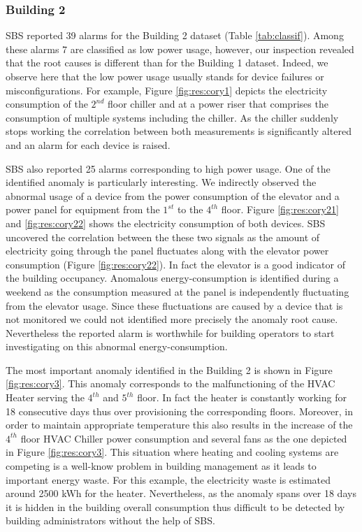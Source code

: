 \subsubsection{Building 2}
SBS reported 39 alarms for the Building 2 dataset (Table \ref{tab:classif}).
Among these alarms 7 are classified as low power usage, however, our inspection revealed that the root causes is different than for the Building 1 dataset.
Indeed, we observe here that the low power usage usually stands for device failures or misconfigurations.
For example, Figure \ref{fig:res:cory1} depicts the electricity consumption of the $2^{nd}$ floor chiller and at a power riser that comprises the consumption of multiple systems including the chiller.
As the chiller suddenly stops working the correlation between both measurements is significantly altered and an alarm for each device is raised.

SBS also reported 25 alarms corresponding to high power usage. 
One of the identified anomaly is particularly interesting.
We indirectly observed the abnormal usage of a device from the power consumption of the elevator and a power panel for equipment from the $1^{st}$ to the $4^{th}$ floor.
Figure \ref{fig:res:cory21} and \ref{fig:res:cory22} shows the electricity consumption of both devices. 
SBS uncovered the correlation between the these two signals as the amount of electricity going through the panel fluctuates along with the elevator power consumption (Figure \ref{fig:res:cory22}).
In fact the elevator is a good indicator of the building occupancy.
Anomalous energy-consumption is identified during a weekend  as the consumption measured at the panel is independently fluctuating from the elevator usage.
Since these fluctuations are caused by a device that is not monitored we could not identified more precisely the anomaly root cause. Nevertheless the reported alarm is worthwhile for building operators to start investigating on this abnormal energy-consumption.

The most important anomaly identified in the Building 2 is shown in Figure \ref{fig:res:cory3}.
This anomaly corresponds to the malfunctioning of the HVAC Heater serving the $4^{th}$ and $5^{th}$ floor. 
In fact the heater is constantly working for 18 consecutive days thus over provisioning the corresponding floors.
Moreover, in order to maintain appropriate temperature this also results in the increase of the $4^{th}$ floor HVAC Chiller power consumption and several fans as the one depicted in Figure \ref{fig:res:cory3}.
This situation where heating and cooling systems are competing is a well-know problem in building management as it leads to important energy waste.
For this example, the electricity waste is estimated around 2500 kWh for the heater.
Nevertheless, as the anomaly spans over 18 days it is hidden in the building overall consumption thus difficult to be detected by building administrators without the help of SBS.
